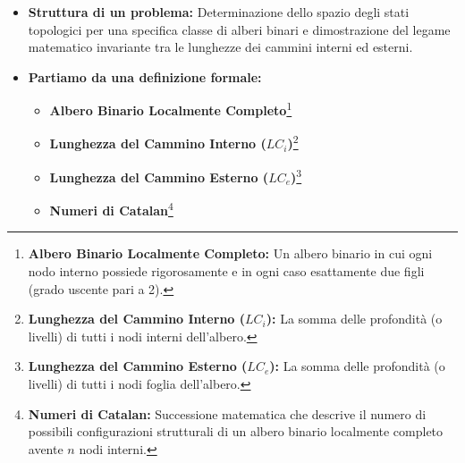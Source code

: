 \documentclass[a4paper, 11pt]{report}
\newcommand{\definizione}[2]{%
\textbf{#1}\footnote{\textbf{#1:} #2}%
}
\begin{document}
\begin{itemize}
\item \textbf{Struttura di un problema:}
Determinazione dello spazio degli stati topologici per una specifica classe di alberi binari e dimostrazione del legame matematico invariante tra le lunghezze dei cammini interni ed esterni.

\item \textbf{Partiamo da una definizione formale:}
\begin{itemize}
    \item \definizione{Albero Binario Localmente Completo}{Un albero binario in cui ogni nodo interno possiede rigorosamente e in ogni caso esattamente due figli (grado uscente pari a 2).}
    \item \definizione{Lunghezza del Cammino Interno ($LC_i$)}{La somma delle profondità (o livelli) di tutti i nodi interni dell'albero.}
    \item \definizione{Lunghezza del Cammino Esterno ($LC_e$)}{La somma delle profondità (o livelli) di tutti i nodi foglia dell'albero.}
    \item \definizione{Numeri di Catalan}{Successione matematica che descrive il numero di possibili configurazioni strutturali di un albero binario localmente completo avente $n$ nodi interni.}
\end{itemize}


\end{itemize}
\end{document}
